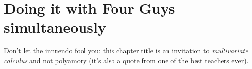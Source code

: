 \chapter{Doing it with Four Guys simultaneously}
Don't let the innuendo fool you: this chapter title is an invitation to \textit{multivariate calculus} and not polyamory (it's also a quote from one of the best teachers ever).